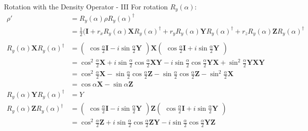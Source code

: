 \documentclass{beamer}
\begin{document}
\begin{frame}{Rotation with the Density Operator - III}
  {\tiny
    For rotation $R_y(\alpha)$:
    \begin{align*}
      \rho' &= R_y(\alpha) \rho R_y(\alpha)^{\dagger} \\
            &= \frac{1}2(\mathbf{I}  + r_x R_y(\alpha) \mathbf{X} R_y(\alpha)^{\dagger}
                                     + r_y R_y(\alpha) \mathbf{Y} R_y(\alpha)^{\dagger} 
                                     + r_z R_y(\alpha) \mathbf{Z} R_y(\alpha)^{\dagger} \\
      \\
      R_y(\alpha) \mathbf{X} R_y(\alpha)^{\dagger}
            &=    \begin{pmatrix} \cos\frac{\alpha}2\mathbf{I} - i\sin\frac{\alpha}2 \mathbf{Y} \end{pmatrix}
                  \mathbf{X}
                  \begin{pmatrix} \cos\frac{\alpha}2\mathbf{I} + i\sin\frac{\alpha}2 \mathbf{Y} \end{pmatrix} \\
            &=    \cos^2\frac{\alpha}2 \mathbf{X}
                + i\sin\frac{\alpha}2 \cos\frac{\alpha}2 \mathbf{X}\mathbf{Y}
                - i\sin\frac{\alpha}2 \cos\frac{\alpha}2 \mathbf{Y}\mathbf{X}
                + \sin^2\frac{\alpha}2 \mathbf{Y}\mathbf{X}\mathbf{Y} \\
            &=    \cos^2\frac{\alpha}2 \mathbf{X}
                - \sin\frac{\alpha}2 \cos\frac{\alpha}2 \mathbf{Z}
                - \sin\frac{\alpha}2 \cos\frac{\alpha}2 \mathbf{Z}
                - \sin^2\frac{\alpha}2 \mathbf{X} \\
            &=    \cos\alpha \mathbf{X} - \sin\alpha \mathbf{Z} \\
      R_y(\alpha) \mathbf{Y} R_y(\alpha)^{\dagger}
            &= Y \\
      R_y(\alpha) \mathbf{Z} R_y(\alpha)^{\dagger}
            &=    \begin{pmatrix} \cos\frac{\alpha}2\mathbf{I} - i\sin\frac{\alpha}2 \mathbf{Y} \end{pmatrix}
                  \mathbf{Z}
                  \begin{pmatrix} \cos\frac{\alpha}2\mathbf{I} + i\sin\frac{\alpha}2 \mathbf{Y} \end{pmatrix} \\
            &=    \cos^2\frac{\alpha}2 \mathbf{Z}
                + i\sin\frac{\alpha}2 \cos\frac{\alpha}2 \mathbf{Z}\mathbf{Y}
                - i\sin\frac{\alpha}2 \cos\frac{\alpha}2 \mathbf{Y}\mathbf{Z}

\end{align*}}
\end{frame}
\end{document}
